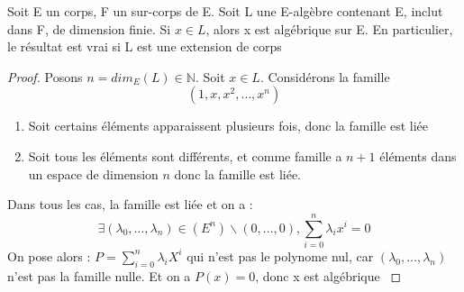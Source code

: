 \documentclass[a4paper,12pt,french]{report}
\begin{document}
			\begin{proposition}
				Soit E un corps, F un sur-corps de E. Soit L une E-algèbre contenant E, inclut dans F, de dimension finie. Si \(x \in L\), alors x est algébrique sur E. En particulier, le résultat est vrai si L est une extension de corps
			\end{proposition}
				\begin{proof}
					Posons \(n = dim_{E}(L) \in \mathbb{N} \). Soit \(x \in L \). Considérons la famille
					\[{}
						\left( 1 , x , x^{2} , \dots , x^{n} \right)
						\]
					\begin{enumerate}
						\item Soit certains éléments apparaissent plusieurs fois, donc la famille est liée
						\item Soit tous les éléments sont différents, et comme famille a \(n+1\) éléments dans un espace de dimension \(n\) donc la famille est liée.
					\end{enumerate}
					Dans tous les cas, la famille est liée et on a : 
						\[{}
							\exists (\lambda_{0},\dots,\lambda_{n}) \in (E^{n})\backslash {(0,\dots,0)}, \sum_{i = 0}^{n} \lambda_{i}x^{i} = 0
						\]
						On pose alors : \(P = \sum_{i = 0}^{n} \lambda_{i}X^{i} \) qui n'est pas le polynome nul, car \( (\lambda_{0},\dots,\lambda_{n}) \) n'est pas la famille nulle. Et on a \(P(x) = 0 \), donc x est algébrique  \( \)
				\end{proof}
			
\end{document}
